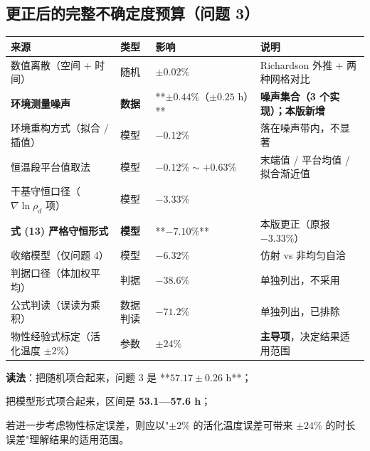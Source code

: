 \subsection{更正后的完整不确定度预算（问题 3）}


\begin{center}
\small
\begin{tabular}{llll}
\toprule
来源 & 类型 & 影响 & 说明 \\
\midrule
数值离散（空间 + 时间） & 随机 & $\pm0.02\%$ & Richardson 外推 + 两种网格对比 \\
\textbf{环境测量噪声} & \textbf{数据} & **$\pm0.44\%$（$\pm0.25$ h）** & \textbf{噪声集合（3 个实现）；本版新增} \\
环境重构方式（拟合 / 插值） & 模型 & $-0.12\%$ & 落在噪声带内，不显著 \\
恒温段平台值取法 & 模型 & $-0.12\%\sim+0.63\%$ & 末端值 / 平台均值 / 拟合渐近值 \\
干基守恒口径（$\nabla\ln\rho_d$ 项） & 模型 & $-3.33\%$ &  \\
\textbf{式 (13) 严格守恒形式} & \textbf{模型} & **$-7.10\%$** & 本版更正（原报 $-3.33\%$） \\
收缩模型（仅问题 4） & 模型 & $-6.32\%$ & 仿射 vs 非均匀自洽 \\
判据口径（体加权平均） & 判据 & $-38.6\%$ & 单独列出，不采用 \\
公式判读（误读为乘积） & 数据判读 & $-71.2\%$ & 单独列出，已排除 \\
物性经验式标定（活化温度 $\pm2\%$） & 参数 & $\pm24\%$ & \textbf{主导项}，决定结果适用范围 \\
\bottomrule
\end{tabular}
\end{center}


\textbf{读法}：把随机项合起来，问题 3 是 **$57.17\pm0.26$ h**；

把模型形式项合起来，区间是 \textbf{53.1—57.6 h}；

若进一步考虑物性标定误差，则应以"$\pm2\%$ 的活化温度误差可带来 $\pm24\%$ 的时长误差"理解结果的适用范围。

